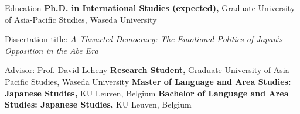 \begin{rubric}{Education}
\entry*[2020/09 -- 2026/03]%
	\textbf{Ph.D. in International Studies (expected),} Graduate University of Asia-Pacific Studies, Waseda University
	\par Dissertation title: \emph{A Thwarted Democracy: The Emotional Politics of Japan's Opposition in the Abe Era}
	\par Advisor: Prof. David Leheny
%
\entry*[2019/04 -- 2020/09]%
	\textbf{Research Student,} Graduate University of Asia-Pacific Studies, Waseda University
%
\entry*[2014/09 -- 2016/09]%
	\textbf{Master of Language and Area Studies: Japanese Studies,} KU Leuven, Belgium
%
\entry*[2010/09 -- 2014/09]%
	\textbf{Bachelor of Language and Area Studies: Japanese Studies,} KU Leuven, Belgium 
\end{rubric}